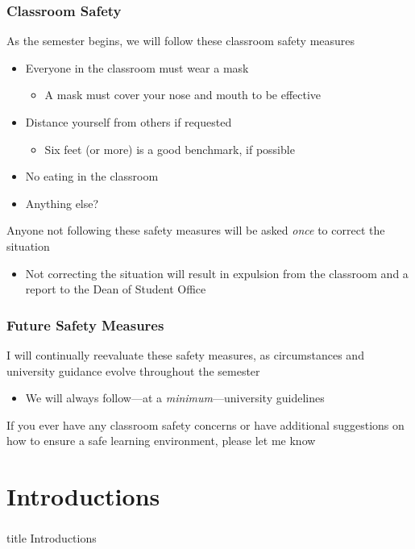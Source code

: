 \documentclass{beamer}
\begin{document}
\begin{frame}\frametitle{Classroom Safety}
    As the semester begins, we will follow these classroom safety measures
    \begin{itemize}
        \item Everyone in the classroom must wear a mask
        \begin{itemize}
            \item A mask must cover your nose and mouth to be effective
        \end{itemize}
        \item Distance yourself from others if requested
        \begin{itemize}
            \item Six feet (or more) is a good benchmark, if possible
        \end{itemize}
        \item No eating in the classroom
        \item Anything else?
    \end{itemize}
    \vspace{3ex}
    Anyone not following these safety measures will be asked \emph{once} to correct the situation
    \begin{itemize}
        \item Not correcting the situation will result in expulsion from the classroom and a report to the Dean of Student Office
    \end{itemize}
\end{frame}

\begin{frame}\frametitle{Future Safety Measures}
    I will continually reevaluate these safety measures, as circumstances and university guidance evolve throughout the semester
    \begin{itemize}
        \item We will always follow---at a \emph{minimum}---university guidelines
    \end{itemize}
    \vspace{6ex}
    If you ever have any classroom safety concerns or have additional suggestions on how to ensure a safe learning environment, please let me know
\end{frame}

\section{Introductions}
\label{introductions}
\begin{frame}\frametitle{}
    \vfill
    \centering
    \begin{beamercolorbox}[center]{title}
        \Large Introductions
    \end{beamercolorbox}
    \vfill
\end{frame}
\end{document}
